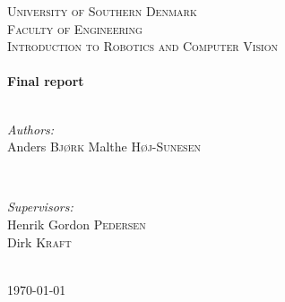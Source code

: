 \begin{titlepage}

\center
\textsc{\LARGE University of Southern Denmark\\Faculty of Engineering}\\[1.5cm] %

\textsc{\Large Introduction to Robotics and Computer Vision
    }\\[0.5cm] %
    \HRule \\
    [0.4cm]

    { \huge \bfseries Final report}\\[0.4cm]
    \HRule \\[1.5cm]
    \begin{minipage}{0.4\textwidth}
        \begin{flushleft} \large
            \emph{Authors:}\\
            Anders \textsc{Bjørk}
            \newline
            Malthe \textsc{Høj-Sunesen} %
        \end{flushleft}
    \end{minipage}
    ~
    \begin{minipage}{0.4\textwidth}
        \begin{flushright} \large
            \emph{Supervisors:} \\
            Henrik Gordon \textsc{Pedersen}\\
            Dirk \textsc{Kraft} %
        \end{flushright}
    \end{minipage}\\[4cm]


    {\large \today}\\[3cm] %
    \vfill %

\end{titlepage}
